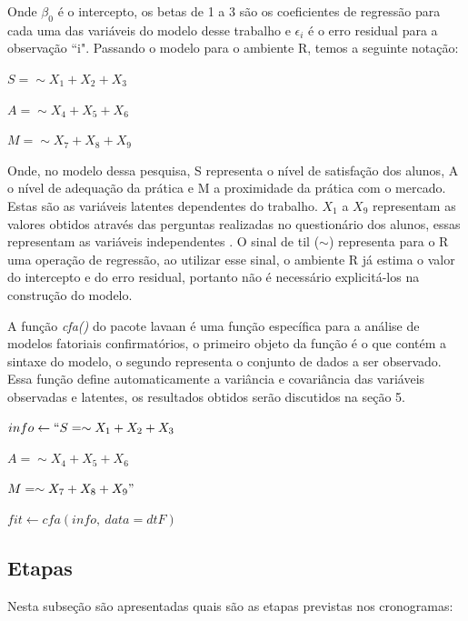 Onde $\beta_{0}$ é o intercepto, os betas de 1 a 3 são os coeficientes de regressão para cada uma das variáveis do modelo desse trabalho e $\epsilon_{i}$ é o erro residual para a observação ``i". Passando o modelo para o ambiente R, temos a seguinte notação:

$S =\sim X_{1} + X_{2} + X_{3}$

$A =\sim X_{4} + X_{5} + X_{6}$

$M =\sim X_{7} + X_{8} + X_{9}$

Onde, no modelo dessa pesquisa, S representa o nível de satisfação dos alunos, A o nível de adequação da prática e M a proximidade da prática com o mercado. Estas são as variáveis latentes dependentes do trabalho. $X_{1}$ a $X_{9}$ representam as valores obtidos através das perguntas realizadas no questionário dos alunos, essas representam as variáveis independentes . O sinal de til ($\sim$) representa para o R uma operação de regressão, ao utilizar esse sinal, o ambiente R já estima o valor do intercepto e do erro residual, portanto não é necessário explicitá-los na construção do modelo.

A função \textit{cfa()} do pacote lavaan é uma função específica para a análise de modelos fatoriais confirmatórios, o primeiro objeto da função é o que contém a sintaxe do modelo, o segundo representa o conjunto de dados a ser observado. Essa função define automaticamente a variância e covariância das variáveis observadas e latentes, os resultados obtidos serão discutidos na seção 5.


$info \leftarrow `` S =\sim X_{1} + X_{2} + X_{3}$

$A =\sim X_{4} + X_{5} + X_{6}$

$M =\sim X_{7} + X_{8} + X_{9} " $

$fit \leftarrow cfa(info,\ data = dtF)$

\subsection{Etapas}
Nesta subseção são apresentadas quais são as etapas previstas nos cronogramas:

